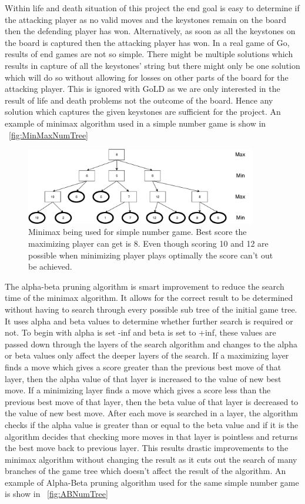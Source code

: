 \documentclass{l4proj}
\begin{document}
Within life and death situation of this project the end goal is easy to determine if the attacking player as no valid moves and the keystones remain on the board then the defending player has won. Alternatively, as soon as all the keystones on the board is captured then the attacking player has won. In a real game of Go, results of end games are not so simple. There might be multiple solutions which results in capture of all the keystones’ string but there might only be one solution which will do so without allowing for losses on other parts of the board for the attacking player. This is ignored with GoLD as we are only interested in the result of life and death problems not the outcome of the board. Hence any solution which captures the given keystones are sufficient for the project. An example of minimax algorithm used in a simple number game is show in ~\autoref{fig:MinMaxNumTree}

\begin{figure}[!h]
\centering
\includegraphics[width=0.9\textwidth]{MinMaxNumTree}
\caption{Minimax being used for simple number game. Best score the maximizing player can get is 8. Even though scoring 10 and 12 are possible when minimizing player plays optimally the score can’t out be achieved.}
\label{fig:MinMaxNumTree}
\end{figure}

The alpha-beta pruning algorithm is smart improvement to reduce the search time of the minimax algorithm. It allows for the correct result to be determined without having to search through every possible sub tree of the initial game tree. It uses alpha and beta values to determine whether further search is required or not. To begin with alpha is set -inf and beta is set to +inf, these values are passed down through the layers of the search algorithm and changes to the alpha or beta values only affect the deeper layers of the search. If a maximizing layer finds a move which gives a score greater than the previous best move of that layer, then the alpha value of that layer is increased to the value of new best move. If a minimizing layer finds a move which gives a score less than the previous best move of that layer, then the beta value of that layer is decreased to the value of new best move.  After each move is searched in a layer, the algorithm checks if the alpha value is greater than or equal to the beta value and if it is the algorithm decides that checking more moves in that layer is pointless and returns the best move back to previous layer. This results drastic improvements to the minimax algorithm without changing the result as it cuts out the search of many branches of the game tree which doesn’t affect the result of the algorithm. An example of Alpha-Beta pruning algorithm used for the same simple number game is show in ~\autoref{fig:ABNumTree}
\end{document}
